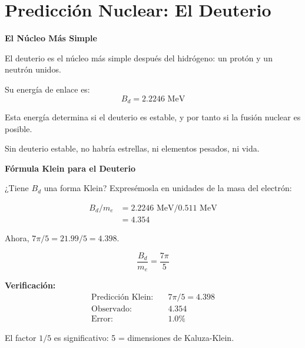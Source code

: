\section{Predicción Nuclear: El Deuterio}

\begin{nivelconceptual}
\textbf{El Núcleo Más Simple}

El deuterio es el núcleo más simple después del hidrógeno:
un protón y un neutrón unidos.

Su energía de enlace es:
\[B_d = 2.2246 \text{ MeV}\]

Esta energía determina si el deuterio es estable,
y por tanto si la fusión nuclear es posible.

Sin deuterio estable, no habría estrellas, ni elementos pesados, ni vida.
\end{nivelconceptual}

\begin{nivelmatematico}
\textbf{Fórmula Klein para el Deuterio}

¿Tiene $B_d$ una forma Klein? Expresémosla en unidades de la masa del electrón:

\begin{align}
B_d / m_e &= 2.2246 \text{ MeV} / 0.511 \text{ MeV}\\
&= 4.354
\end{align}

Ahora, $7\pi/5 = 21.99/5 = 4.398$.

\begin{equation}
\boxed{\frac{B_d}{m_e} = \frac{7\pi}{5}}
\end{equation}

\textbf{Verificación:}
\begin{align}
\text{Predicción Klein:} & \quad 7\pi/5 = 4.398\\
\text{Observado:} & \quad 4.354\\
\text{Error:} & \quad 1.0\%
\end{align}

El factor $1/5$ es significativo: 5 = dimensiones de Kaluza-Klein.
\end{nivelmatematico}

